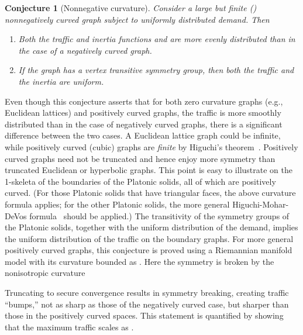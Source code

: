 \documentclass{article}
\newtheorem{conjecture}{Conjecture}
\begin{document}
\begin{conjecture}[Nonnegative curvature]
Consider a large but finite () nonnegatively curved graph  subject to uniformly distributed demand. Then
\begin{enumerate} 
\item Both the traffic and inertia functions  and  are more evenly distributed 
than in the case of a negatively curved graph.
\item If the graph has a vertex transitive symmetry group, then both the traffic and the 
inertia are uniform.  
\end{enumerate}
\end{conjecture}
\noindent
Even though this conjecture asserts that for both 
zero curvature graphs (e.g., Euclidean lattices) and positively curved graphs, 
the traffic is more smoothly distributed than in the case of negatively curved graphs, 
there is a significant difference between the two cases. 
A Euclidean lattice graph could be infinite, 
while positively curved (cubic) graphs are {\it finite}
by Higuchi's theorem~\cite{japanese_combinatorial_curvature,positively_curved_graphs,reti_4_combinatorial_curvature,mohar}.  
Positively curved graphs need not be truncated 
and hence enjoy more symmetry than truncated Euclidean or hyperbolic graphs. 
This point is easy to illustrate 
on the 1-skeleta of the boundaries of the Platonic solids, 
all of which are positively curved. 
(For those Platonic solids that have triangular faces, the above curvature formula applies; 
for the other Platonic solids, 
the more general Higuchi-Mohar-DeVos formula~\cite{mohar} should be applied.)   
The transitivity of the symmetry groups of the Platonic solids, 
together with the uniform distribution of the demand, 
implies the uniform distribution of the traffic on the boundary graphs. 
For more general positively curved graphs, 
this conjecture is proved using a Riemannian manifold model 
with its curvature bounded as . 
Here the symmetry is broken by the nonisotropic curvature

Truncating  to secure convergence results in symmetry breaking, 
creating traffic ``bumps,'' not as sharp as those of the negatively curved case, 
but sharper than those in the positively curved spaces.  
This statement is quantified by showing 
that the maximum traffic scales as . 





\noindent 

\noindent 
\end{document}
